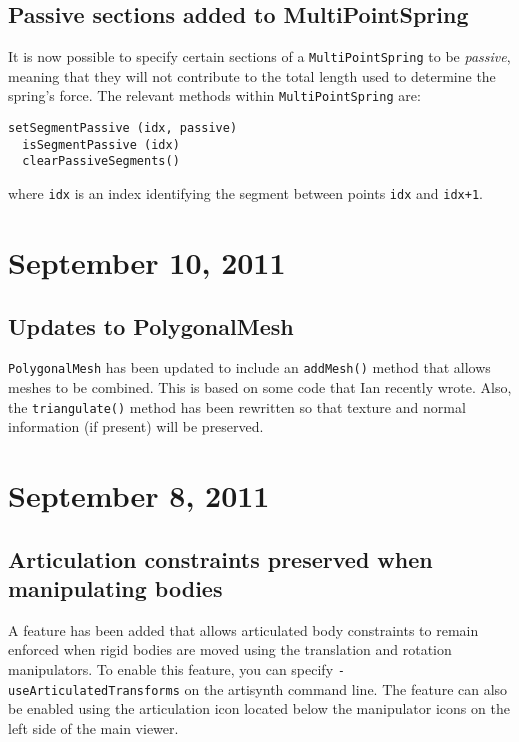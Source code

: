 \documentclass{article}
\begin{document}
\subsection*{Passive sections added to MultiPointSpring}

It is now possible to specify certain sections of a {\tt MultiPointSpring}
to be {\it passive}, meaning that they will not contribute to the total
length used to determine the spring's force. The relevant
methods within {\tt MultiPointSpring} are:

\begin{lstlisting}[]
  setSegmentPassive (idx, passive)
  isSegmentPassive (idx)
  clearPassiveSegments()
\end{lstlisting}

where {\tt idx} is an index identifying the segment between points
{\tt idx} and {\tt idx+1}.

\section*{September 10, 2011}

\subsection*{Updates to PolygonalMesh}

{\tt PolygonalMesh} has been updated to include an {\tt addMesh()} method that
allows meshes to be combined. This is based on some code that Ian
recently wrote. Also, the {\tt triangulate()} method has been rewritten so
that texture and normal information (if present) will be preserved.

\section*{September 8, 2011}

\subsection*{Articulation constraints preserved when manipulating bodies}

A feature has been added that allows articulated body constraints to
remain enforced when rigid bodies are moved using the translation and
rotation manipulators. To enable this feature, you can specify
{\tt -useArticulatedTransforms} on the artisynth command line.  The
feature can also be enabled using the articulation icon located below
the manipulator icons on the left side of the main viewer.
\end{document}
